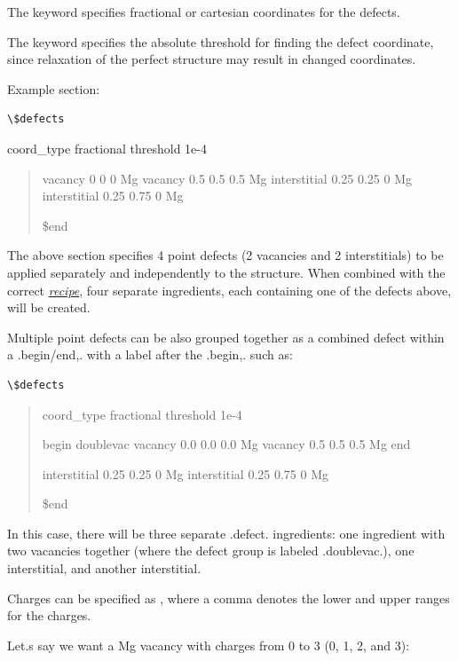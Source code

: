 \documentclass[letterpaper,10pt,english]{sphinxmanual}
\begin{document}
The  keyword specifies fractional or cartesian coordinates for the defects.

The  keyword specifies the absolute threshold for finding the defect coordinate, since relaxation of the perfect structure may result in changed coordinates.

Example  section:

\begin{Verbatim}[commandchars=\\\{\}]
\$defects
\end{Verbatim}

coord\_type fractional
threshold 1e-4
\begin{quote}

vacancy 0 0 0 Mg
vacancy 0.5 0.5 0.5 Mg
interstitial 0.25 0.25 0 Mg
interstitial 0.25 0.75 0 Mg

\$end
\end{quote}

The above section specifies 4 point defects (2 vacancies and 2 interstitials) to be applied separately and independently to the structure. When combined with the correct {\hyperref[4_0_recipe::doc]{\emph{recipe}}}, four separate ingredients, each containing one of the defects above, will be created.

Multiple point defects can be also grouped together as a combined defect within a .begin/end,. with a label after the .begin,. such as:

\begin{Verbatim}[commandchars=\\\{\}]
\$defects
\end{Verbatim}
\begin{quote}

coord\_type fractional
threshold 1e-4

begin doublevac
vacancy 0.0 0.0 0.0 Mg
vacancy 0.5 0.5 0.5 Mg
end

interstitial 0.25 0.25 0 Mg
interstitial 0.25 0.75 0 Mg

\$end
\end{quote}

In this case, there will be three separate .defect. ingredients: one ingredient with two vacancies together (where the defect group is labeled .doublevac.), one interstitial, and another interstitial.

Charges can be specified as , where a comma denotes the lower and upper ranges for the charges.

Let.s say we want a Mg vacancy with charges from 0 to 3 (0, 1, 2, and 3):
\end{document}
